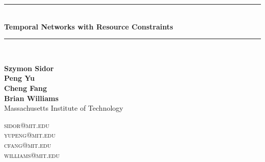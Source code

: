 \documentclass{article}
\newcommand{\HRule}{\rule{\linewidth}{0.5mm}}
\begin{document}
\thispagestyle{empty}

\begin{center}
\HRule \\[0.3cm]
{\Large \bfseries
Temporal Networks with Resource Constraints\\[0.3cm]}
\HRule \\[0.5cm]

\noindent
\begin{minipage}{0.5\textwidth}
\begin{flushleft}
\textbf{Szymon Sidor\\
Peng Yu\\
Cheng Fang\\
Brian Williams}\\
Massachusetts Institute of Technology
\end{flushleft}
\end{minipage}%
\begin{minipage}{0.5\textwidth}
\begin{flushright}
\textsc{sidor@mit.edu}\\
\textsc{yupeng@mit.edu}\\
\textsc{cfang@mit.edu}\\
\textsc{williams@mit.edu}\\
$\ $
\end{flushright}
\end{minipage}
\\[1cm]
\end{center}
\pagestyle{fancy}
\end{document}
